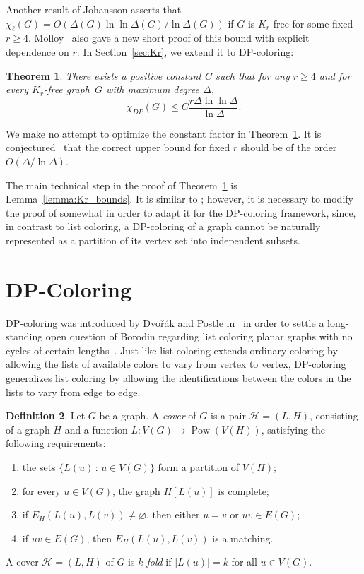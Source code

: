 \documentclass[11pt, reqno, psamsfonts]{amsart}
\newtheorem{theo}{Theorem}[section]
\theoremstyle{definition}
\newtheorem{defn}[theo]{Definition}
\theoremstyle{remark}
\newcommand{\0}{\varnothing}
\newcommand{\set}[1]{\{#1\}}
\renewcommand{\leq}{\leqslant}
\renewcommand{\geq}{\geqslant}
\newcommand{\powerset}[1]{\operatorname{Pow}(#1)}
\newcommand{\Cov}[1]{\mathscr{#1}}
\numberwithin{equation}{section}
\begin{document}
	
	Another result of Johansson asserts that $\chi_\ell(G) = O(\Delta(G) \ln \ln \Delta(G) / \ln \Delta(G))$ if $G$ is $K_r$-free for some fixed $r\geq 4$. Molloy~\cite[Theorem~2]{Mol17} also gave a new short proof of this bound with explicit dependence on $r$. In Section~\ref{sec:Kr}, we extend it to DP-coloring:
	
	\begin{theo}\label{theo:Kr}
		There exists a positive constant $C$ such that for any $r \geq 4$ and for every $K_r$-free graph~$G$ with maximum degree $\Delta$,
		\[
			\chi_{DP}(G) \leq C\frac{r\Delta \ln \ln \Delta}{\ln \Delta}.
		\]
	\end{theo}
	
	We make no attempt to optimize the constant factor in Theorem~\ref{theo:Kr}. It is conjectured~\cite[Conjecture~3.1]{AKS} that the correct upper bound for fixed $r$ should be of the order $O(\Delta/\ln \Delta)$.
	
	The main technical step in the proof of Theorem~\ref{theo:Kr} is Lemma~\ref{lemma:Kr_bounds}. It is similar to \cite[Lemma~15]{Mol17}; however, it is necessary to modify the proof of \cite[Lemma~15]{Mol17} somewhat in order to adapt it for the DP-coloring framework, since, in contrast to list coloring, a DP-coloring of a graph cannot be naturally represented as a partition of its vertex set into independent subsets.
	
	\section{DP-Coloring}\label{sec:DP}
	
	\noindent DP-coloring was introduced by Dvo\v{r}\'{a}k and Postle in~\cite{DP} in order to settle a long-standing open question of Borodin regarding list coloring planar graphs with no cycles of certain lengths~\cite[Problem~8.1]{Bor13}. Just like list coloring extends ordinary coloring by allowing the lists of available colors to vary from vertex to vertex, DP-coloring generalizes list coloring by allowing the identifications between the colors in the lists to vary from edge to edge.
	
	\begin{defn}\label{defn:cover}
		Let $G$ be a graph. A \emph{cover} of $G$ is a pair $\Cov{H} = (L, H)$, consisting of a graph $H$ and a function $L \colon V(G) \to \powerset{V(H)}$, satisfying the following requirements:
		\begin{enumerate}[labelindent=\parindent,leftmargin=*,label=(C\arabic*)]
			\item the sets $\set{L(u) \,:\,u \in V(G)}$ form a partition of $V(H)$;
			\item for every $u \in V(G)$, the graph $H[L(u)]$ is complete;
			\item if $E_H(L(u), L(v)) \neq \0$, then either $u = v$ or $uv \in E(G)$;
			\item \label{item:matching} if $uv \in E(G)$, then $E_H(L(u), L(v))$ is a matching.
		\end{enumerate}
		A cover $\Cov{H} = (L, H)$ of $G$ is \emph{$k$-fold} if $|L(u)| = k$ for all $u \in V(G)$.
	\end{defn}
	
\end{document}
